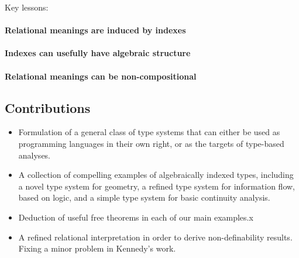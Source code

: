 Key lessons:

\paragraph{Relational meanings are induced by indexes}

\paragraph{Indexes can usefully have algebraic structure}

\paragraph{Relational meanings can be non-compositional}

\subsection{Contributions}
\label{sec:contributions}

\begin{itemize}
\item Formulation of a general class of type systems that can either
  be used as programming languages in their own right, or as the
  targets of type-based analyses.
\item A collection of compelling examples of algebraically indexed
  types, including a novel type system for geometry, a refined type
  system for information flow, based on logic, and a simple type
  system for basic continuity analysis.
\item Deduction of useful free theorems in each of our main examples.x
\item A refined relational interpretation in order to derive
  non-definability results. Fixing a minor problem in Kennedy's work.
\end{itemize}

